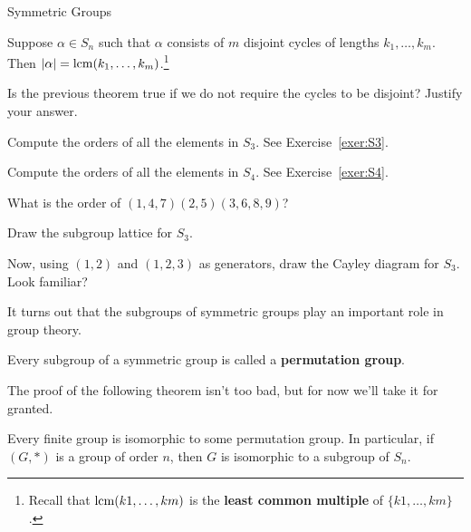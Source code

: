 \begin{section}{Symmetric Groups}
\begin{theorem}
Suppose \(\alpha\in S_n\) such that \(\alpha\) consists of \(m\) disjoint cycles of lengths \(k_1,\ldots, k_m\).  Then \(|\alpha|=\operatorname{lcm}(k_1,\ldots, k_m)\).\footnote{Recall that \(\operatorname{lcm}(k 1,\ldots, k m)\) is the \textbf{least common multiple} of \(\{k 1,\ldots, k m\}\).} 
\end{theorem}

\begin{problem}
Is the previous theorem true if we do not require the cycles to be disjoint?  Justify your answer.
\end{problem}

\begin{exercise}
Compute the orders of all the elements in \(S_3\).  See Exercise~\ref{exer:S3}.
\end{exercise}

\begin{exercise}
Compute the orders of all the elements in \(S_4\).  See Exercise~\ref{exer:S4}.
\end{exercise}

\begin{exercise}
What is the order of \((1,4,7)(2,5)(3,6,8,9)\)?
\end{exercise}

\begin{exercise}
Draw the subgroup lattice for \(S_3\).
\end{exercise}

\begin{exercise}
Now, using \((1,2)\) and \((1,2,3)\) as generators, draw the Cayley diagram for \(S_3\).  Look familiar?
\end{exercise}

It turns out that the subgroups of symmetric groups play an important role in group theory.

\begin{definition}
Every subgroup of a symmetric group is called a \textbf{permutation group}.
\end{definition}

The proof of the following theorem isn't too bad, but for now we'll take it for granted.

\begin{theorem}
Every finite group is isomorphic to some permutation group.  In particular, if \((G,*)\) is a group of order \(n\), then \(G\) is isomorphic to a subgroup of \(S_n\).
\end{theorem}


\end{section}
